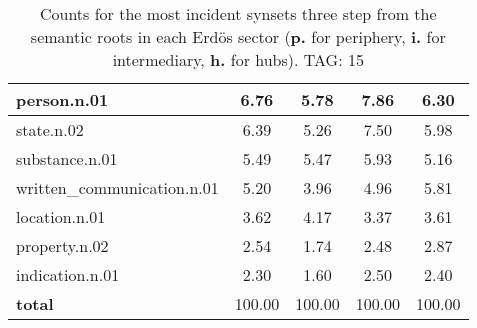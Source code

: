 \begin{table}[h!]
\begin{center}
\begin{tabular}{| l || c | c | c | c |}
person.n.01 & 6.76  & 5.78  & 7.86  & 6.30 \\\hline
state.n.02 & 6.39  & 5.26  & 7.50  & 5.98 \\\hline
substance.n.01 & 5.49  & 5.47  & 5.93  & 5.16 \\\hline
written\_communication.n.01 & 5.20  & 3.96  & 4.96  & 5.81 \\\hline
location.n.01 & 3.62  & 4.17  & 3.37  & 3.61 \\\hline
property.n.02 & 2.54  & 1.74  & 2.48  & 2.87 \\\hline
indication.n.01 & 2.30  & 1.60  & 2.50  & 2.40 \\\hline\hline
{{\bf total}} & 100.00  & 100.00  & 100.00  & 100.00 \\\hline
\end{tabular}
\caption{Counts for the most incident synsets three step from the semantic roots in each Erd\"os sector ({\bf p.} for periphery, {\bf i.} for intermediary, {\bf h.} for hubs). TAG: 15}
\end{center}
\end{table}